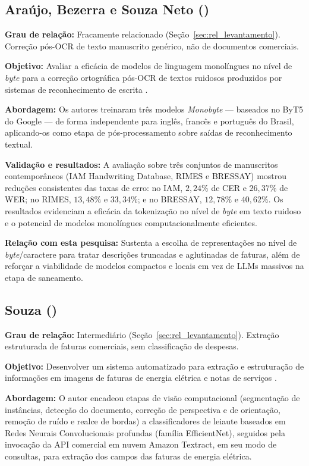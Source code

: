 \subsection{Araújo, Bezerra e Souza Neto (\citeyear{araujo2024saneamento})}
\textbf{Grau de relação:} Fracamente relacionado (Seção~\ref{sec:rel_levantamento}). Correção pós-OCR de texto manuscrito genérico, não de documentos comerciais.

\textbf{Objetivo:} Avaliar a eficácia de modelos de linguagem monolíngues no nível de \textit{byte} para a correção ortográfica pós-OCR de textos ruidosos produzidos por sistemas de reconhecimento de escrita \cite{araujo2024saneamento}.

\textbf{Abordagem:} Os autores treinaram três modelos \textit{Monobyte} --- baseados no ByT5 do Google \cite{xue2021byt5} --- de forma independente para inglês, francês e português do Brasil, aplicando-os como etapa de pós-processamento sobre saídas de reconhecimento textual.

\textbf{Validação e resultados:} A avaliação sobre três conjuntos de manuscritos contemporâneos (IAM Handwriting Database, RIMES e BRESSAY) mostrou reduções consistentes das taxas de erro: no IAM, $2{,}24\%$ de CER e $26{,}37\%$ de WER; no RIMES, $13{,}48\%$ e $33{,}34\%$; e no BRESSAY, $12{,}78\%$ e $40{,}62\%$. Os resultados evidenciam a eficácia da tokenização no nível de \textit{byte} em texto ruidoso e o potencial de modelos monolíngues computacionalmente eficientes.

\textbf{Relação com esta pesquisa:} Sustenta a escolha de representações no nível de \textit{byte}/caractere para tratar descrições truncadas e aglutinadas de faturas, além de reforçar a viabilidade de modelos compactos e locais em vez de LLMs massivos na etapa de saneamento.

\subsection{Souza (\citeyear{souza2025extracao})}
\textbf{Grau de relação:} Intermediário (Seção~\ref{sec:rel_levantamento}). Extração estruturada de faturas comerciais, sem classificação de despesas.

\textbf{Objetivo:} Desenvolver um sistema automatizado para extração e estruturação de informações em imagens de faturas de energia elétrica e notas de serviços \cite{souza2025extracao}.

\textbf{Abordagem:} O autor encadeou etapas de visão computacional (segmentação de instâncias, detecção do documento, correção de perspectiva e de orientação, remoção de ruído e realce de bordas) a classificadores de leiaute baseados em Redes Neurais Convolucionais profundas (família EfficientNet), seguidos pela invocação da API comercial em nuvem Amazon Textract, em seu modo de consultas, para extração dos campos das faturas de energia elétrica.

